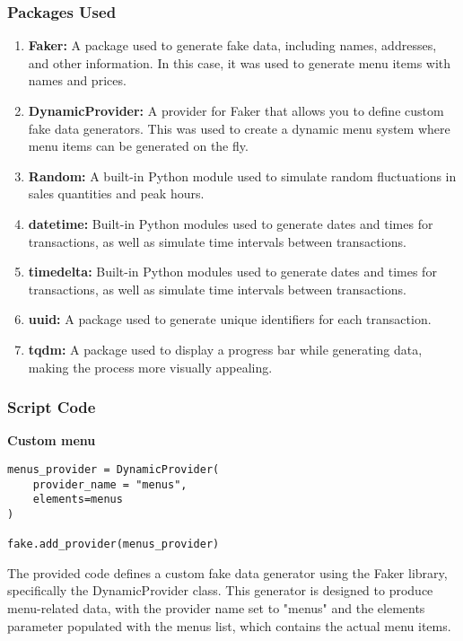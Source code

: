 \subsubsection{Packages Used}

\begin{enumerate}
	\item \textbf{Faker:} A package used to generate fake data, including names, addresses, and other information. In this case, it was used to generate menu items with names and prices.
	\item \textbf{DynamicProvider:} A provider for Faker that allows you to define custom fake data generators. This was used to create a dynamic menu system where menu items can be generated on the fly.
	\item \textbf{Random:} A built-in Python module used to simulate random fluctuations in sales quantities and peak hours.
	\item \textbf{datetime:} Built-in Python modules used to generate dates and times for transactions, as well as simulate time intervals between transactions.
	\item \textbf{timedelta:} Built-in Python modules used to generate dates and times for transactions, as well as simulate time intervals between transactions.
	\item \textbf{uuid:} A package used to generate unique identifiers for each transaction.
	\item \textbf{tqdm:} A package used to display a progress bar while generating data, making the process more visually appealing.
\end{enumerate}

\subsubsection{Script Code}

	\textbf{Custom menu}
	
	\begin{lstlisting}
menus_provider = DynamicProvider(
	provider_name = "menus",
	elements=menus
)

fake.add_provider(menus_provider)
	\end{lstlisting}
	
	The provided code defines a custom fake data generator using the Faker library, specifically the DynamicProvider class. This generator is designed to produce menu-related data, with the provider name set to "menus" and the elements parameter populated with the menus list, which contains the actual menu items.
	
